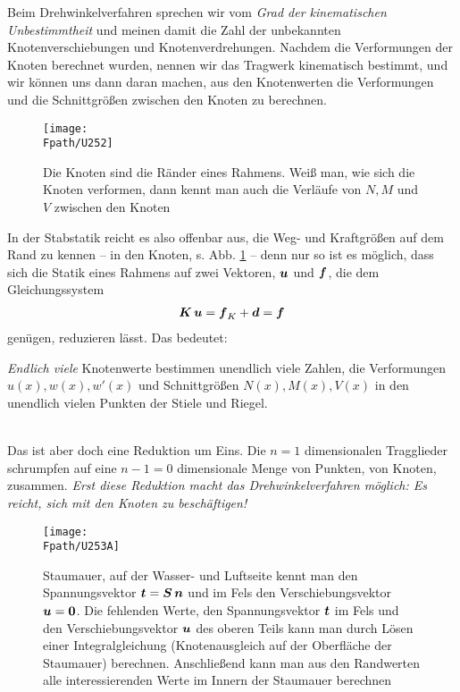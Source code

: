 {{{{Beim Drehwinkelverfahren sprechen wir vom {\em Grad der kinematischen Unbestimmtheit\/} und meinen damit die Zahl der unbekannten Knotenverschiebungen und Knotenverdrehungen. Nachdem die Verformungen der Knoten berechnet wurden, nennen wir das Tragwerk kinematisch bestimmt, und wir k\"{o}nnen uns dann daran machen, aus den Knotenwerten die Verformungen und die Schnittgr\"{o}{\ss}en zwischen den Knoten zu berechnen.
\begin{figure}[tbp]
\centering
\if {} \sidecaption \fi
\texttt{[image: \\Fpath/U252]}  %
\caption{Die Knoten sind die \glq R\"{a}nder\grq{} eines Rahmens. Wei{\ss} man, wie sich die Knoten verformen, dann kennt man auch die Verl\"{a}ufe von $N, M$ und $V$ zwischen den Knoten} \label{U252}
\end{figure}%

In der Stabstatik reicht es also offenbar aus, die Weg- und Kraftgr\"{o}{\ss}en auf dem \glq Rand\grq{} zu kennen -- in den Knoten, s. Abb. \ref{U252} -- denn nur so ist es m\"{o}glich, dass sich die Statik eines Rahmens auf zwei Vektoren, $\mbox{\boldmath $u$}$ und $\mbox{\boldmath $f$}$, die dem Gleichungssystem
\begin{align}
\mbox{\boldmath $K$}\,\mbox{\boldmath $u$} = \mbox{\boldmath $f$}_K + \mbox{\boldmath $d$} = \mbox{\boldmath $f$}
\end{align}
gen\"{u}gen, reduzieren l\"{a}sst. Das bedeutet:\\

\hspace*{-12pt}\colorbox{highlightBlue}{\parbox{0.98\textwidth}{{\em Endlich viele\/} Knotenwerte bestimmen unendlich viele Zahlen, die Verformungen $u(x), w(x), w'(x) $ und Schnittgr\"{o}{\ss}en  $ N(x), M(x), V(x)$ in den unendlich vielen Punkten der Stiele und Riegel.}}
\\

Das ist aber doch eine Reduktion um Eins. Die $n = 1$ dimensionalen Tragglieder schrumpfen auf eine $n - 1 = 0$ dimensionale Menge von Punkten, von Knoten, zusammen. {\em Erst diese Reduktion macht das  Drehwinkelverfahren m\"{o}glich: Es reicht, sich mit den Knoten zu besch\"{a}ftigen!\/}
\begin{figure}[tbp]
\centering
\if {} \sidecaption \fi
\texttt{[image: \\Fpath/U253A]}
\caption{Staumauer, auf der Wasser- und Luftseite kennt man den Spannungsvektor $\mbox{\boldmath $t$} = \mbox{\boldmath $S$}\,\mbox{\boldmath $n$}$ und im Fels den Verschiebungsvektor $\mbox{\boldmath $u$} = \mbox{\boldmath $0$}$. Die fehlenden Werte, den Spannungsvektor $\mbox{\boldmath $t$}$ im Fels und den Verschiebungsvektor $\mbox{\boldmath $u$}$ des oberen Teils kann man durch L\"{o}sen einer Integralgleichung (\glq Knotenausgleich auf der Oberfl\"{a}che der Staumauer\grq{}) berechnen. Anschlie{\ss}end kann man aus den Randwerten alle interessierenden Werte im Innern der Staumauer berechnen} \label{U253}
\end{figure}%

}}}}
